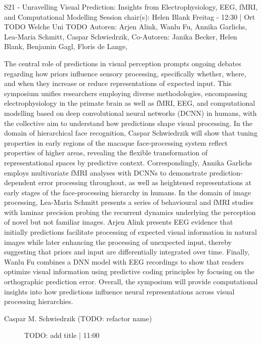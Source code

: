 
            \begin{symposium}
            {S21 - Unravelling Visual Prediction: Insights from Electrophysiology, EEG, fMRI, and Computational Modelling}
            {Session chair(s): Helen Blank}
            {Freitag  - 12:30 | Ort TODO}
            {Welche Uni TODO}
            Autoren: Arjen Alink, Wanlu Fu, Annika Garlichs, Lea-Maria Schmitt, Caspar Schwiedrzik, Co-Autoren: Janika Becker, Helen Blank, Benjamin Gagl, Floris de Lange, 

The central role of predictions in visual perception prompts ongoing debates regarding how priors influence sensory processing, specifically whether, where, and when they increase or reduce representations of expected input. This symposium unifies researchers employing diverse methodologies, encompassing electrophysiology in the primate brain as well as fMRI, EEG, and computational modelling based on deep convolutional neural networks (DCNN) in humans, with the collective aim to understand how predictions shape visual processing.
In the domain of hierarchical face recognition, Caspar Schwiedrzik will show that tuning properties in early regions of the macaque face-processing system reflect properties of higher areas, revealing the flexible transformation of representational spaces by predictive context. Correspondingly, Annika Garlichs employs multivariate fMRI analyses with DCNNs to demonstrate prediction-dependent error processing throughout, as well as heightened representations at early stages of the face-processing hierarchy in humans. In the domain of image processing, Lea-Maria Schmitt presents a series of behavioural and fMRI studies with laminar precision probing the recurrent dynamics underlying the perception of novel but not familiar images. Arjen Alink presents EEG evidence that initially predictions facilitate processing of expected visual information in natural images while later enhancing the processing of unexpected input, thereby suggesting that priors and input are differentially integrated over time. Finally, Wanlu Fu combines a DNN model with EEG recordings to show that readers optimize visual information using predictive coding principles by focusing on the orthographic prediction error. Overall, the symposium will provide computational insights into how predictions influence neural representations across visual processing hierarchies.
            \begin{description}    
            
                \item [Caspar M. Schwiedrzik (TODO: refactor name)] TODO: add title \textcolor{mygray}{ | 11:00}    
                

\end{description}
\end{symposium}
